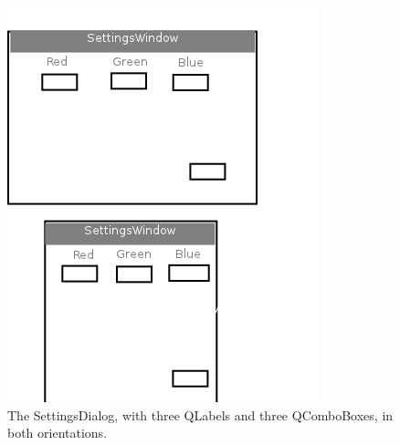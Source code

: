 \documentclass[12pt]{article}
\begin{document}
\begin{figure}[H]
  \centering
    \includegraphics{settingswindow.png}
  \caption{The SettingsDialog, with three QLabels and three QComboBoxes, in both
  orientations.}
\end{figure}
\end{document}
